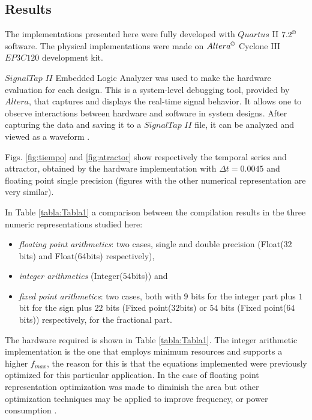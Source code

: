 \subsection{Results}
\label{sec:resultados}

The implementations presented here were fully developed with
$Quartus$ II $7.2^\copyright$ software. The physical
implementations were made on $Altera^\copyright$ Cyclone III
$EP3C120$ development kit.

$SignalTap$ $II$ Embedded Logic Analyzer was used to make the
hardware evaluation for each design. This is a system-level debugging tool, provided by
$Altera$,  that captures and
displays the real-time signal behavior. It allows  one to observe
interactions between hardware and software in system designs.
After capturing the data and saving it to a $SignalTap$ $II$ file,
it can be analyzed and viewed as a waveform \cite{QUARTUS}.

Figs. \ref{fig:tiempo} and \ref{fig:atractor} show respectively the temporal
series and attractor, obtained by the hardware implementation with $\Delta t=0.0045$ and floating point single precision (figures with the other numerical representation are very similar).

In Table \ref{tabla:Tabla1} a comparison between the compilation results in
the three numeric representations studied here:
\begin{itemize}
\item \textit{floating point arithmetics}: two cases, single and double
precision (Float($32$bits) and Float($64$bits)
respectively),
\item \textit{integer arithmetics} (Integer($54$bits)) and
\item \textit{fixed point arithmetics}: two cases, both with   $9$ bits for the integer part plus
$1$ bit for the sign plus $22$ bits  (Fixed point($32$bits) or $54$ bits (Fixed
point($64$bits)) respectively, for the fractional part.
\end{itemize}
The hardware required is shown in Table \ref{tabla:Tabla1}. The
integer arithmetic implementation is the one that employs minimum
resources and supports a higher $f_{max}$, the reason for this is
that the equations implemented were previously optimized for this
particular application. In the case of floating point
representation optimization was made to diminish the area but
other optimization techniques may be applied to improve frequency,
or power consumption \cite{Giri2012,Gokul2004}.

